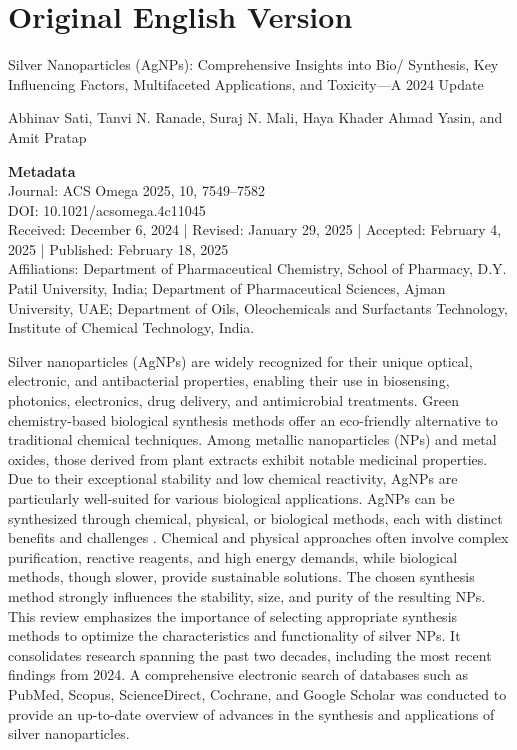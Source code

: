 \documentclass[pdflatex,sn-mathphys-num]{sn-jnl}
\begin{document}
\section*{Original English Version}

\begin{center}
  {\LARGE Silver Nanoparticles (AgNPs): Comprehensive Insights into Bio/ Synthesis,
    Key Influencing Factors, Multifaceted Applications, and Toxicity---A 2024 Update
  \par}
  \vspace{0.5cm}
  {\large Abhinav Sati, Tanvi N. Ranade, Suraj N. Mali, Haya Khader Ahmad Yasin,
  and Amit Pratap \par}
\end{center}

\vspace{0.5cm}
\noindent\textbf{Metadata}\\
Journal: ACS Omega 2025, 10, 7549--7582 \\
DOI: 10.1021/acsomega.4c11045 \\
Received: December 6, 2024 | Revised: January 29, 2025 |
Accepted: February 4, 2025 | Published: February 18, 2025 \\
Affiliations: Department of Pharmaceutical Chemistry, School of Pharmacy, D.Y.
Patil University, India; Department of Pharmaceutical
Sciences, Ajman University, UAE; Department of Oils,
Oleochemicals and Surfactants Technology, Institute of Chemical Technology,
India.
\cite{satiSilverNanoparticlesAgNPs2025}

\vspace{0.5cm}
Silver nanoparticles (AgNPs) are widely recognized for their unique optical,
electronic, and antibacterial properties, enabling their use in biosensing,
photonics, electronics, drug delivery, and antimicrobial treatments.
Green chemistry-based biological synthesis methods offer an eco-friendly
alternative to traditional chemical techniques. Among metallic
nanoparticles (NPs) and metal oxides, those derived from plant extracts exhibit
notable medicinal properties. Due to their exceptional stability
and low chemical reactivity, AgNPs are particularly well-suited for various
biological applications. AgNPs can be synthesized through chemical,
physical, or biological methods, each with distinct benefits and challenges
. Chemical and physical approaches often involve complex
purification, reactive reagents, and high energy demands, while biological
methods, though slower, provide sustainable solutions. The chosen
synthesis method strongly influences the stability, size, and purity of the
resulting NPs. This review emphasizes the importance of
selecting appropriate synthesis methods to optimize the characteristics and
functionality of silver NPs. It consolidates research spanning the
past two decades, including the most recent findings from 2024. A
comprehensive electronic search of databases such as PubMed, Scopus,
ScienceDirect, Cochrane, and Google Scholar was conducted to provide an
up-to-date overview of advances in the synthesis and applications of silver
nanoparticles.
\end{document}
